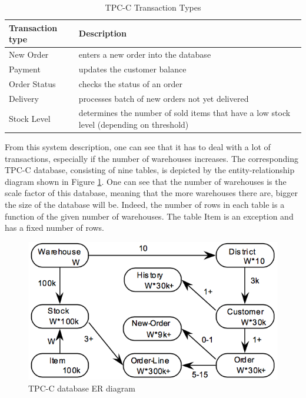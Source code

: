 \begin{table}[h]
	\centering
	\begin{tabular}{|m{4cm}|m{9cm}|}
		\hline
		\textbf{Transaction type} & \textbf{Description}\\
		\hline
		New Order & enters a new order into the database\\
		\hline
		Payment & updates the customer balance\\
		\hline
		Order Status & checks the status of an order\\
		\hline
		Delivery & processes batch of new orders not yet delivered\\
		\hline
		Stock Level & determines the number of sold items that have a low stock level (depending on threshold)\\
		\hline
	\end{tabular}
	\caption{TPC-C Transaction Types}
	\label{table:tpcc_trans_type_list}
\end{table}

From this system description, one can see that it has to deal with a lot of transactions, especially if the number of warehouses increases.
The corresponding TPC-C database, consisting of nine tables, is depicted by the entity-relationship diagram shown in Figure \ref{fig:tpcc_erd}.
One can see that the number of warehouses is the scale factor of this database, meaning that the more warehouses there are, bigger the size of the database will be.
Indeed, the number of rows in each table is a function of the given number of warehouses.
The table Item is an exception and has a fixed number of rows.

\begin{figure}[h]
	\centering
	\includegraphics[scale=0.5]{figures/tpcc_erd.png}
	\caption{TPC-C database ER diagram \cite[p. 11]{tpcc10}}
	\label{fig:tpcc_erd}
\end{figure}

